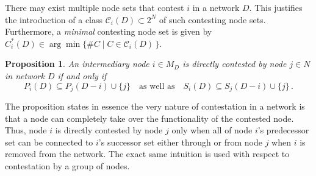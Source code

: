 \documentclass[11pt,fleqn]{article}
\newtheorem{proposition}[theorem]{Proposition}
\begin{document}
\noindent
There may exist multiple node sets that contest $i$ in a network $D$. This justifies the introduction of a class $\mathcal{C}_i (D) \subset 2^N$ of such contesting node sets. Furthermore, a \emph{minimal} contesting node set is given by $C_{i}^{*}(D) \in \arg \min \{ \# C \mid C \in \mathcal{C}_{i} (D) \, \}$.

\begin{proposition}
	An intermediary node $i \in M_D$ is directly contested by node $j \in N$ in network $D$ if and only if
	\begin{equation} \label{Directly Contested}
	    P_{i}(D) \subseteq P_{j} (D - i) \cup \{j\} \quad \mbox{as well as} \quad S_{i} (D) \subseteq S_{j} (D - i) \cup \{ j \} \, .
	\end{equation}
\end{proposition}

\noindent
The proposition states in essence the very nature of contestation in a network is that a node can completely take over the functionality of the contested node. Thus, node $i$ is directly contested by node $j$ only when all of node $i$'s predecessor set can be connected to $i$'s successor set either through or from node $j$ when $i$ is removed from the network. The exact same intuition is used with respect to contestation by a group of nodes.
\end{document}
